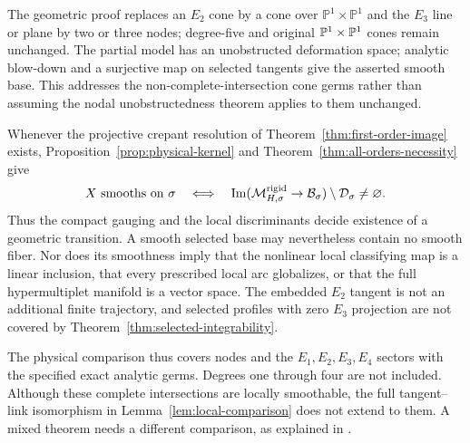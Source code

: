 The geometric proof replaces an $E_2$ cone by a cone over
$\mathbb P^1\times\mathbb P^1$ and the $E_3$ line or plane by two or
three nodes; degree-five and original $\mathbb P^1\times\mathbb P^1$ cones
remain unchanged. The partial model has an unobstructed deformation space;
analytic blow-down and a surjective map on selected tangents give the
asserted smooth base. This addresses the non-complete-intersection cone
germs rather than assuming the nodal unobstructedness theorem applies to
them unchanged.

Whenever the projective crepant resolution of
Theorem~\ref{thm:first-order-image} exists, Proposition~\ref{prop:physical-kernel}
and Theorem~\ref{thm:all-orders-necessity} give
\begin{equation}
 X\text{ smooths on }\sigma
 \quad\Longleftrightarrow\quad
 \operatorname{Im}(\mathcal M_{H,\sigma}^{\mathrm{rigid}}\to\mathcal B_\sigma)
       \setminus\mathcal D_\sigma\ne\varnothing.
 \label{eq:physical-exact-criterion}
\end{equation}
Thus the compact gauging and the local discriminants decide existence of
a geometric transition. A smooth selected base may nevertheless contain
no smooth fiber. Nor does its smoothness imply that the nonlinear local
classifying map is a linear inclusion, that every prescribed local arc
globalizes, or that the full hypermultiplet manifold is a vector space.
The embedded $E_2$ tangent is not an additional finite trajectory, and
selected profiles with zero $E_3$ projection are not covered by
Theorem~\ref{thm:selected-integrability}.

The physical comparison thus covers nodes and the $E_1,E_2,E_3,E_4$
sectors with the specified exact analytic germs. Degrees one through four
are not included. Although these complete intersections are locally
smoothable, the full tangent--link isomorphism in
Lemma~\ref{lem:local-comparison} does not extend to them. A mixed theorem needs a different
comparison, as explained in \cite[Section~1.2]{Wuebben:2026smoothing}.
